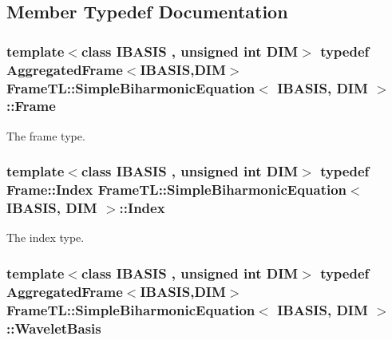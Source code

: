 \subsection{Member Typedef Documentation}
\hypertarget{classFrameTL_1_1SimpleBiharmonicEquation_b92f00909f0e7a185bcdede446570546}{
\subsubsection[{Frame}]{\setlength{\rightskip}{0pt plus 5cm}template$<$class IBASIS , unsigned int DIM$>$ {\bf typedef} {\bf AggregatedFrame}$<$IBASIS,DIM$>$ {\bf FrameTL::SimpleBiharmonicEquation}$<$ IBASIS, DIM $>$::{\bf Frame}}}
\label{classFrameTL_1_1SimpleBiharmonicEquation_b92f00909f0e7a185bcdede446570546}


The frame type. \hypertarget{classFrameTL_1_1SimpleBiharmonicEquation_35f42b79db1b8e156c3cdb3c22122e74}{
\subsubsection[{Index}]{\setlength{\rightskip}{0pt plus 5cm}template$<$class IBASIS , unsigned int DIM$>$ {\bf typedef} {\bf Frame::Index} {\bf FrameTL::SimpleBiharmonicEquation}$<$ IBASIS, DIM $>$::{\bf Index}}}
\label{classFrameTL_1_1SimpleBiharmonicEquation_35f42b79db1b8e156c3cdb3c22122e74}


The index type. \hypertarget{classFrameTL_1_1SimpleBiharmonicEquation_feee9bcf85adb1115a5487773a5d8d32}{
\subsubsection[{WaveletBasis}]{\setlength{\rightskip}{0pt plus 5cm}template$<$class IBASIS , unsigned int DIM$>$ {\bf typedef} {\bf AggregatedFrame}$<$IBASIS,DIM$>$ {\bf FrameTL::SimpleBiharmonicEquation}$<$ IBASIS, DIM $>$::{\bf WaveletBasis}}}
\label{classFrameTL_1_1SimpleBiharmonicEquation_feee9bcf85adb1115a5487773a5d8d32}


